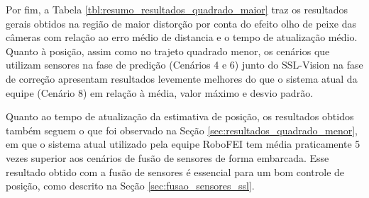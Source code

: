 \documentclass[acronym, symbols, table, deposito]{fei}
\begin{document}
		Por fim, a Tabela \ref{tbl:resumo_resultados_quadrado_maior} traz os resultados gerais obtidos na região de maior distorção por conta do efeito olho de peixe das câmeras com relação ao erro médio de distancia e o tempo de atualização médio. Quanto à posição, assim como no trajeto quadrado menor, os cenários que utilizam sensores na fase de predição (Cenários 4 e 6) junto do SSL-Vision na fase de correção apresentam resultados levemente melhores do que o sistema atual da equipe (Cenário 8) em relação à média, valor máximo e desvio padrão.
		
		Quanto ao tempo de atualização da estimativa de posição, os resultados obtidos também seguem o que foi observado na Seção \ref{sec:resultados_quadrado_menor}, em que o sistema atual utilizado pela equipe RoboFEI tem média praticamente 5 vezes superior aos cenários de fusão de sensores de forma embarcada. Esse resultado obtido com a fusão de sensores é essencial para um bom controle de posição, como descrito na Seção \ref{sec:fusao_sensores_ssl}.
	
		\begin{table}[!htb]
			\centering
			\caption{Resumo dos resultados obtidos dos cenários no teste com quadrado maior.}
			\label{tbl:resumo_resultados_quadrado_maior}
		\end{table}
\end{document}
